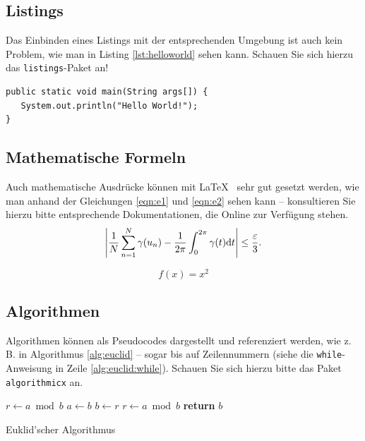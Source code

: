\subsection{Listings}	

Das Einbinden eines Listings mit der entsprechenden Umgebung ist auch kein Problem, wie man in Listing \vref{lst:helloworld} sehen kann. Schauen Sie sich hierzu das \texttt{listings}-Paket an! 
		
		\newpage
		
		
\lstset{language=Java}
\begin{lstlisting}[caption={Hello World!}, label={lst:helloworld}]
public static void main(String args[]) {
   System.out.println("Hello World!");
}
\end{lstlisting}


\subsection{Mathematische Formeln}
Auch mathematische Ausdrücke können mit \LaTeX~ sehr gut gesetzt werden, wie man anhand der Gleichungen \vref{eqn:e1} und \vref{eqn:e2} sehen kann -- konsultieren Sie hierzu bitte entsprechende Dokumentationen, die Online zur Verfügung stehen.
\begin{equation}
\left|{1\over N}\sum_{n=1}^N \gamma(u_n)-{1\over 2\pi}\int_0^{2\pi}\gamma(t){\mathrm{d}}t\right| \le {\varepsilon\over 3}.\\
\label{eqn:e1}
\end{equation}

\begin{equation}
f(x)=x^2
\label{eqn:e2}
\end{equation}



\subsection{Algorithmen}
Algorithmen können als Pseudocodes dargestellt und referenziert werden, wie z.\,B. in Algorithmus \vref{alg:euclid} -- sogar bis auf Zeilennummern
(siehe die \texttt{while}-Anweisung in Zeile \vref{alg:euclid:while}). Schauen Sie sich hierzu bitte das Paket \texttt{algorithmicx} an.



\begin{algorithm}
\begin{algorithmic}[1]
   \State $r\gets a\bmod b$
    \label{alg:euclid:while}
      \State $a\gets b$
      \State $b\gets r$
      \State $r\gets a\bmod b$
   \EndWhile\label{euclidendwhile}
   \State \textbf{return} $b$
\EndProcedure
\end{algorithmic}
\caption{Euklid'scher Algorithmus}\label{alg:euclid}
\end{algorithm}



